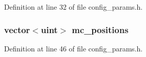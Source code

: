 Definition at line 32 of file config\_\-params.h.
\subsubsection[{mc\_\-positions}]{\setlength{\rightskip}{0pt plus 5cm}vector$<${\bf uint}$>$ {\bf mc\_\-positions}}\label{genericInterfaceVcs_8h_f58ebe62f79b2e470f0cb7da0f7a7ea5}




Definition at line 46 of file config\_\-params.h.